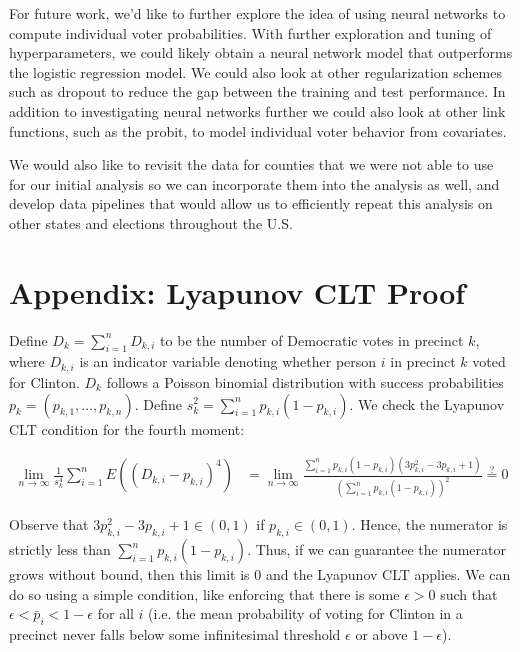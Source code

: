 \documentclass[10pt, letterpaper]{article}
\begin{document}
\begin{multicols}{2}
For future work, we'd like to further explore the idea of using neural networks to compute individual voter probabilities. With further exploration and tuning of hyperparameters, we could likely obtain a neural network model that outperforms the logistic regression model. We could also look at other regularization schemes such as dropout to reduce the gap between the training and test performance. In addition to investigating neural networks further we could also look at other link functions, such as the probit, to model individual voter behavior from covariates. 

We would also like to revisit the data for counties that we were not able to use for our initial analysis so we can incorporate them into the analysis as well, and develop data pipelines that would allow us to efficiently repeat this analysis on other states and elections throughout the U.S. 
\end{multicols}

\section*{Appendix: Lyapunov CLT Proof}

Define $D_k = \sum_{i = 1}^n D_{k, i}$ to be the number of Democratic votes in precinct $k$, where $D_{k, i}$ is an indicator variable denoting whether person $i$ in precinct $k$ voted for Clinton. $D_k$ follows a Poisson binomial distribution with success probabilities $p_k = (p_{k, 1}, \dots, p_{k, n})$. Define $s_{k}^2 = \sum_{i = 1}^{n} p_{k, i} (1-p_{k, i})$. 
We check the Lyapunov CLT \cite{billingsley1995probability} condition for the fourth moment: 

\begin{align*}
\lim_{n \to \infty} \frac{1}{s_k^4} \sum_{i = 1}^n E \left( (D_{k, i} - p_{k, i})^4 \right) &= \lim_{n \to \infty} \frac{\sum_{i = 1}^n p_{k, i}(1-p_{k, i}) \left( 3p_{k, i}^2 - 3p_{k, i} + 1 \right)}{\left(\sum_{i = 1}^n p_{k, i} \left( 1- p_{k, i} \right) \right)^2} \stackrel{?} = 0 
\end{align*}

Observe that $3p_{k, i}^2 - 3p_{k, i} + 1 \in (0, 1)$ if $p_{k, i} \in (0, 1)$. Hence, the numerator is strictly less than $\sum_{i = 1}^n p_{k, i} (1 - p_{k, i})$. Thus, if we can guarantee the numerator grows without bound, then this limit is 0 and the Lyapunov CLT applies. We can do so using a simple condition, like enforcing that there is some $\epsilon > 0$ such that $\epsilon < \bar p_i < 1- \epsilon$ for all $i$ (i.e. the mean probability of voting for Clinton in a precinct never falls below some infinitesimal threshold $\epsilon$ or above $1-\epsilon$). 
\end{document}
